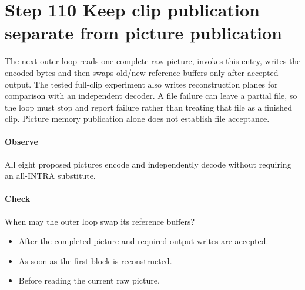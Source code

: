 \section{Step 110 Keep clip publication separate from picture publication}\label{h263-picture-s10}
The next outer loop reads one complete raw picture, invokes this entry, writes
the encoded bytes and then swaps old/new reference buffers only after accepted
output. The tested full-clip experiment also writes reconstruction planes for
comparison with an independent decoder. A file failure can leave a partial file,
so the loop must stop and report failure rather than treating that file as a
finished clip. Picture memory publication alone does not establish file acceptance.

\paragraph{Observe} All eight proposed pictures encode and independently decode without requiring an all-INTRA substitute.
\paragraph{Check} When may the outer loop swap its reference buffers?
\begin{itemize}
  \item[A.] After the completed picture and required output writes are accepted.
  \item[B.] As soon as the first block is reconstructed.
  \item[C.] Before reading the current raw picture.
\end{itemize}
